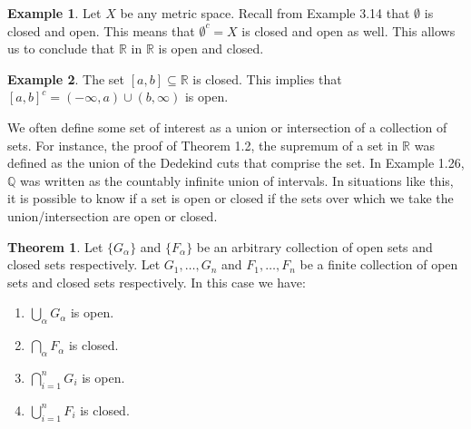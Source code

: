 \documentclass{article}
\newcommand{\R}{\mathbb{R}}
\newcommand{\Q}{\mathbb{Q}}
\theoremstyle{definition}
\newtheorem{theorem}{Theorem}[section]
\newtheorem{example}{Example}[section]
\begin{document}
	\begin{example}
		Let $ X $ be any metric space. Recall from Example 3.14 that $ \emptyset $ is closed and open. This means that $ \emptyset^c=X $ is closed and open as well. This allows us to conclude that $ \R $ in $ \R $ is open and closed.
	\end{example}
	\begin{example}
		The set $ [a,b]\subseteq \R $ is closed. This implies that $ [a,b]^c=(-\infty,a)\cup(b,\infty) $ is open.
	\end{example}
	We often define some set of interest as a union or intersection of a collection of sets. For instance, the proof of Theorem 1.2, the supremum of a set in $ \R $ was defined as the union of the Dedekind cuts that comprise the set. In Example 1.26, $ \Q $ was written as the countably infinite union of intervals. In situations like this, it is possible to know if a set is open or closed if the sets over which we take the union/intersection are open or closed. 
	\begin{theorem}
		Let $ \{G_\alpha\} $ and $ \{F_\alpha\} $ be an arbitrary collection of open sets and closed sets respectively. Let $ G_1,\ldots,G_n $ and $ F_1,\ldots, F_n $ be a finite collection of open sets and closed sets respectively. In this case we have:
		\begin{enumerate}
			\item $ \bigcup_\alpha G_\alpha $ is open.
			\item $ \bigcap_\alpha F_\alpha $ is closed.
			\item $ \bigcap_{i=1}^n G_i$ is open.
			\item $ \bigcup_{i=1}^n F_i$ is closed.
		\end{enumerate}
		
	\end{theorem}
	
\end{document}
